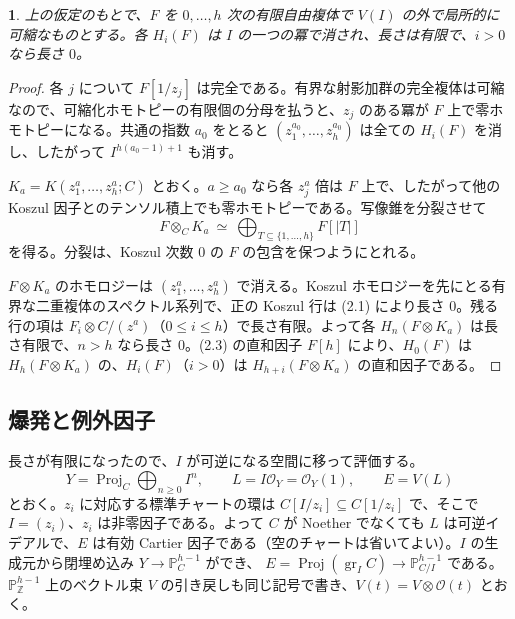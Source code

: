 \documentclass[11pt,a4paper]{ltjsarticle}
\newcommand{\stmtname}{}
\theoremstyle{plain}
\newtheorem*{stmtgen}{\stmtname}
\newenvironment{stmt}[1]{\renewcommand{\stmtname}{#1}\begin{stmtgen}}{\end{stmtgen}}
\theoremstyle{definition}
\newcommand{\Proj}{\operatorname{Proj}}
\newcommand{\gr}{\operatorname{gr}}
\newcommand{\Z}{\mathbb{Z}}
\newcommand{\PP}{\mathbb{P}}
\newcommand{\cO}{\mathcal{O}}
\begin{document}
\begin{stmt}{補題 2.2}
上の仮定のもとで、$F$ を $0,\dots,h$ 次の有限自由複体で $V(I)$ の外で局所的に可縮なものとする。各 $H_i(F)$ は $I$ の一つの冪で消され、長さは有限で、$i>0$ なら長さ $0$。
\end{stmt}
\begin{proof}
各 $j$ について $F[1/z_j]$ は完全である。有界な射影加群の完全複体は可縮なので、可縮化ホモトピーの有限個の分母を払うと、$z_j$ のある冪が $F$ 上で零ホモトピーになる。共通の指数 $a_0$ をとると $(z_1^{a_0},\dots,z_h^{a_0})$ は全ての $H_i(F)$ を消し、したがって $I^{h(a_0-1)+1}$ も消す。

$K_a = K(z_1^a,\dots,z_h^a;C)$ とおく。$a\ge a_0$ なら各 $z_j^a$ 倍は $F$ 上で、したがって他の Koszul 因子とのテンソル積上でも零ホモトピーである。写像錐を分裂させて
\begin{equation}\tag{2.3}
  F\otimes_CK_a\ \simeq\ \bigoplus_{T\subseteq\{1,\dots,h\}}F[|T|]
\end{equation}
を得る。分裂は、Koszul 次数 $0$ の $F$ の包含を保つようにとれる。

$F\otimes K_a$ のホモロジーは $(z_1^a,\dots,z_h^a)$ で消える。Koszul ホモロジーを先にとる有界な二重複体のスペクトル系列で、正の Koszul 行は (2.1) により長さ $0$。残る行の項は $F_i\otimes C/(z^a)$（$0\le i\le h$）で長さ有限。よって各 $H_n(F\otimes K_a)$ は長さ有限で、$n>h$ なら長さ $0$。(2.3) の直和因子 $F[h]$ により、$H_0(F)$ は $H_h(F\otimes K_a)$ の、$H_i(F)$（$i>0$）は $H_{h+i}(F\otimes K_a)$ の直和因子である。
\end{proof}

\subsection{爆発と例外因子}
長さが有限になったので、$I$ が可逆になる空間に移って評価する。
\[
  Y = \Proj_C\bigoplus_{n\ge0}I^n,\qquad L = I\cO_Y = \cO_Y(1),\qquad E = V(L)
\]
とおく。$z_i$ に対応する標準チャートの環は $C[I/z_i]\subseteq C[1/z_i]$ で、そこで $I = (z_i)$、$z_i$ は非零因子である。よって $C$ が Noether でなくても $L$ は可逆イデアルで、$E$ は有効 Cartier 因子である（空のチャートは省いてよい）。$I$ の生成元から閉埋め込み $Y\to\PP^{h-1}_C$ ができ、
$E = \Proj(\gr_IC)\to\PP^{h-1}_{C/I}$
である。$\PP^{h-1}_\Z$ 上のベクトル束 $V$ の引き戻しも同じ記号で書き、$V(t) = V\otimes\cO(t)$ とおく。
\end{document}
